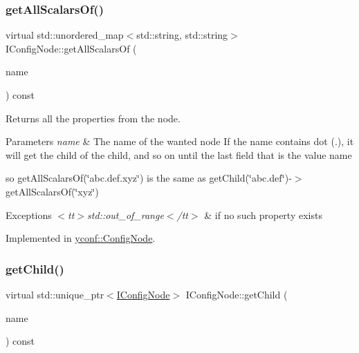 \subsubsection{\texorpdfstring{get\+All\+Scalars\+Of()}{getAllScalarsOf()}}
{\footnotesize\ttfamily virtual std\+::unordered\+\_\+map$<$std\+::string, std\+::string$>$ I\+Config\+Node\+::get\+All\+Scalars\+Of (\begin{DoxyParamCaption}\item[{const std\+::string \&}]{name }\end{DoxyParamCaption}) const\hspace{0.3cm}{\ttfamily [pure virtual]}}



Returns all the properties from the node. 


\begin{DoxyParams}{Parameters}
{\em name} & The name of the wanted node If the name contains dot ({\ttfamily .}), it will get the child of the child, and so on until the last field that is the value name\\
\hline
\end{DoxyParams}
so {\ttfamily get\+All\+Scalars\+Of(\char`\"{}abc.\+def.\+xyz\char`\"{})} is the same as {\ttfamily get\+Child(\char`\"{}abc.\+def\char`\"{})-\/$>$get\+All\+Scalars\+Of(\char`\"{}xyz\char`\"{})}


\begin{DoxyExceptions}{Exceptions}
{\em $<$tt$>$std\+::out\+\_\+of\+\_\+range$<$/tt$>$} & if no such property exists \\
\hline
\end{DoxyExceptions}


Implemented in \hyperlink{classyconf_1_1ConfigNode_af15d6504faf3cf1be0aa5efc5603035f}{yconf\+::\+Config\+Node}.

\mbox{\label{classIConfigNode_a113e74aac6e8c62f5d5762b766f934e6}} 
\subsubsection{\texorpdfstring{get\+Child()}{getChild()}}
{\footnotesize\ttfamily virtual std\+::unique\+\_\+ptr$<$\hyperlink{classIConfigNode}{I\+Config\+Node}$>$ I\+Config\+Node\+::get\+Child (\begin{DoxyParamCaption}\item[{const std\+::string \&}]{name }\end{DoxyParamCaption}) const\hspace{0.3cm}{\ttfamily [pure virtual]}}



